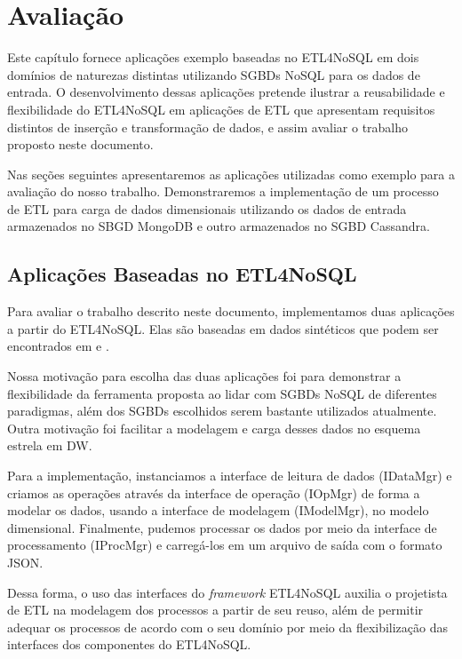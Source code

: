 \chapter{Avaliação}

Este capítulo fornece aplicações exemplo baseadas no ETL4NoSQL em dois domínios de naturezas distintas utilizando SGBDs NoSQL para os dados de entrada. O desenvolvimento dessas aplicações pretende ilustrar a reusabilidade e flexibilidade do ETL4NoSQL em aplicações de ETL que apresentam requisitos distintos de inserção e transformação de dados, e assim avaliar o trabalho proposto neste documento.

Nas seções seguintes apresentaremos as aplicações utilizadas como exemplo para a avaliação do nosso trabalho. Demonstraremos a implementação de um processo de ETL para carga de dados dimensionais utilizando os dados de entrada armazenados no SBGD MongoDB e outro armazenados no SGBD Cassandra.

\clearpage	

\section{Aplicações Baseadas no ETL4NoSQL}

Para avaliar o trabalho descrito neste documento, implementamos duas aplicações a partir do ETL4NoSQL. Elas são baseadas em dados sintéticos que podem ser encontrados em \cite{dataMongo} e \cite{dataCassandra}. 

Nossa motivação para escolha das duas aplicações foi para demonstrar a flexibilidade da ferramenta proposta ao lidar com SGBDs NoSQL de diferentes paradigmas, além dos SGBDs escolhidos serem bastante utilizados atualmente. Outra motivação foi facilitar a modelagem e carga desses dados no esquema estrela em DW.

Para a implementação, instanciamos a interface de leitura de dados (IDataMgr) e criamos as operações através da interface de operação (IOpMgr) de forma a modelar os dados, usando a interface de modelagem (IModelMgr), no modelo dimensional. Finalmente, pudemos processar os dados por meio da interface de processamento (IProcMgr) e carregá-los em um arquivo de saída com o formato JSON.

Dessa forma, o uso das interfaces do \textit{framework} ETL4NoSQL auxilia o projetista de ETL na modelagem dos processos a partir de seu reuso, além de permitir adequar os processos de acordo com o seu domínio por meio da flexibilização das interfaces dos componentes do ETL4NoSQL.

